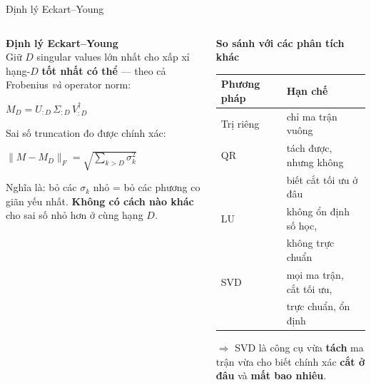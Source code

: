 \documentclass[aspectratio=169, 11pt]{beamer}
\newcommand{\good}[1]{\textcolor{qgreen}{#1}}
\newcommand{\eqn}[1]{\begin{center}\colorbox{eqbox}{\color{qcyan}$\displaystyle #1$}\end{center}}
\begin{document}
\begin{frame}[shrink=5]{Định lý Eckart--Young}

\begin{columns}[T]
\begin{column}{0.55\textwidth}

\textcolor{qpurple}{\textbf{Định lý Eckart--Young}}\\[3pt]
{\small Giữ $D$ singular values lớn nhất cho xấp xỉ hạng-$D$ \textbf{tốt nhất có thể} — theo cả Frobenius \textit{và} operator norm:}
\eqn{M_D = U_{:D}\,\Sigma_{:D}\,V^\dagger_{:D}}

{\small Sai số truncation đo được chính xác:}
\eqn{\|M - M_D\|_F = \sqrt{\textstyle\sum_{k>D}\sigma_k^2}}

\vspace{4pt}
{\small Nghĩa là: bỏ các $\sigma_k$ nhỏ = bỏ các phương co giãn yếu nhất.
\textbf{Không có cách nào khác} cho sai số nhỏ hơn ở cùng hạng $D$.}

\end{column}
\begin{column}{0.42\textwidth}

\vspace{2pt}
\textcolor{qamber}{\textbf{So sánh với các phân tích khác}}

\vspace{6pt}
{\small
\renewcommand{\arraystretch}{1.3}
\begin{tabular}{@{}l@{\quad}l@{}}
\toprule
\textbf{Phương pháp} & \textbf{Hạn chế} \\
\midrule
Trị riêng & chỉ ma trận vuông \\
QR & tách được, nhưng không \\
   & biết cắt tối ưu ở đâu \\
LU & không ổn định số học, \\
   & không trực chuẩn \\
\midrule
\good{SVD} & \good{mọi ma trận, cắt tối ưu,} \\
           & \good{trực chuẩn, ổn định} \\
\bottomrule
\end{tabular}}

\vspace{6pt}
{\small\textcolor{dimtext}{$\Rightarrow$ SVD là công cụ vừa \textbf{tách} ma trận vừa cho biết chính xác \textbf{cắt ở đâu} và \textbf{mất bao nhiêu}.}}

\end{column}
\end{columns}

\end{frame}
\end{document}
